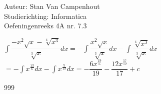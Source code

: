 \documentclass[a4paper]{article}
\begin{document}
  
\noindent \large Auteur: Stan Van Campenhout \\
\noindent \large Studierichting:  Informatica\\
\noindent \large Oefeningenreeks 4A nr. 7.3\\

\medskip

\normalsize

$ \displaystyle\int \dfrac{-x^2\sqrt{x}-\sqrt[4]{x^3}}{\sqrt[3]{x}} dx = - \displaystyle\int \dfrac{x^2\sqrt{x}}{\sqrt[3]{x}} dx - \displaystyle\int \dfrac{\sqrt[4]{x^3}}{\sqrt[3]{x}} dx $\\

$ = -\displaystyle\int x^{\tfrac{13}{6}}dx - \displaystyle\int x^{\tfrac{5}{12}}dx = -\dfrac{6x^{\tfrac{19}{6}}}{19} - \dfrac{12x^{\tfrac{17}{12}}}{17} + c $\\

\begin{thebibliography}{999}
\end{thebibliography}
\end{document}
